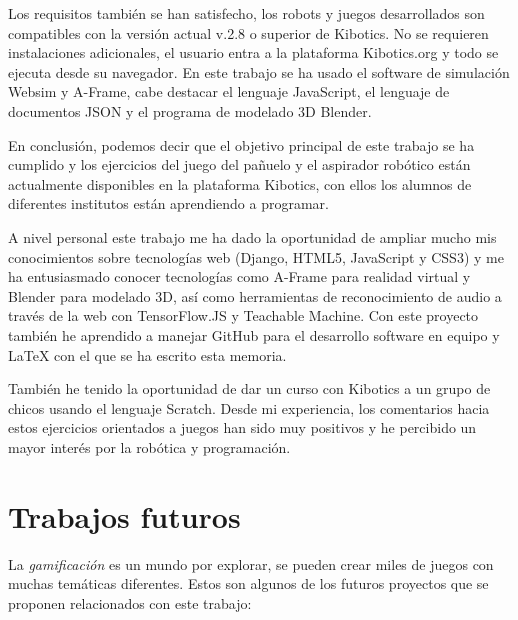 Los requisitos  también se han satisfecho, los robots y juegos desarrollados son compatibles con la versión actual v.2.8 o superior de Kibotics. No se requieren instalaciones adicionales, el usuario entra a la plataforma Kibotics.org y todo se ejecuta desde su navegador.  En este trabajo se ha usado el software de simulación Websim y A-Frame, cabe destacar el lenguaje JavaScript, el lenguaje de documentos JSON y el programa de modelado 3D Blender.

En conclusión,  podemos decir que el objetivo principal de este trabajo se ha cumplido y los ejercicios del juego del pañuelo y el aspirador robótico están actualmente disponibles en la plataforma Kibotics, con ellos los alumnos de diferentes institutos están aprendiendo a programar.

A nivel personal este trabajo me ha dado la oportunidad de ampliar mucho mis conocimientos sobre tecnologías web (Django, HTML5, JavaScript y CSS3) y me ha entusiasmado conocer tecnologías como A-Frame para realidad virtual y Blender para modelado 3D, así como herramientas de reconocimiento de audio a través de la web con TensorFlow.JS y Teachable Machine.
Con este proyecto también he aprendido a manejar GitHub para el desarrollo software en equipo y LaTeX con el que se ha escrito esta memoria.

También he tenido la oportunidad de dar un curso con Kibotics a un grupo de chicos usando el lenguaje Scratch. Desde mi experiencia, los comentarios hacia estos ejercicios orientados a juegos han sido muy positivos y he percibido un mayor interés por la robótica y programación.

    
\section{Trabajos futuros}

La \textit{gamificación} es un mundo por explorar, se pueden crear miles de juegos con muchas temáticas diferentes. Estos son algunos de los futuros proyectos que se proponen relacionados con este trabajo:


